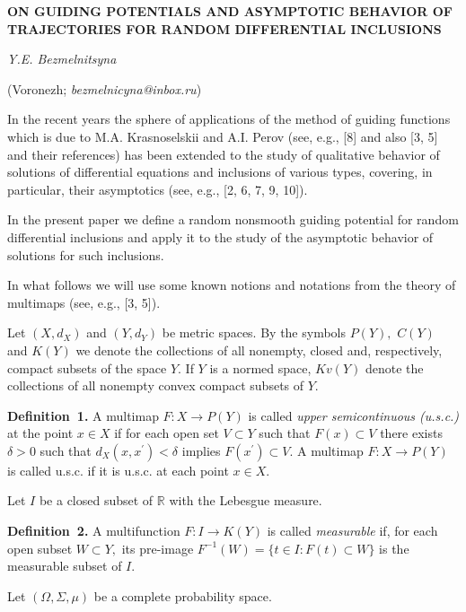 
\begin{center}
    {\bf ON GUIDING POTENTIALS AND ASYMPTOTIC BEHAVIOR OF TRAJECTORIES FOR RANDOM DIFFERENTIAL INCLUSIONS}

    {\it Y.E. Bezmelnitsyna }

    (Voronezh; {\it bezmelnicyna@inbox.ru})
\end{center}


In the recent years the sphere of applications of the method of guiding functions which is due to M.A. Krasnoselskii and A.I. Perov (see, e.g., [8] and also [3, 5] and their references) has been extended to the study of qualitative behavior of solutions of differential equations and inclusions of various types, covering, in particular, their asymptotics (see, e.g., [2, 6, 7, 9, 10]).

In the present paper we define a random nonsmooth guiding potential for random differential inclusions and apply it to the study of the asymptotic behavior of solutions for such inclusions.

In what follows we will use some known notions and notati\-ons from the theory of multimaps (see, e.g., [3, 5]).

Let $(X,d_X)$ and $(Y,d_Y)$ be metric spaces. By the symbols $P(Y),$ $C(Y)$ and $K(Y)$ we denote the collections of all nonempty, closed and, respectively, compact subsets of the space $Y.$ If $Y$ is a normed space, $Kv(Y)$ denote the collections of all nonempty convex compact subsets of $Y.$

\textbf{Definition~1.}
A multimap $F:X \to P(Y)$ is called {\it upper semicontinuous (u.s.c.)} at the point $x\in X$ if for each open set $V \subset Y$ such that $F(x) \subset V$ there exists $\delta >0$ such that $d_X(x,x^\prime)<\delta$ implies $F(x^\prime)\subset V.$ A multimap $F:X \to P(Y)$ is called u.s.c. if it is u.s.c. at each point $x\in X.$

Let $I$ be a closed subset of $\mathbb{R}$ with the Lebesgue measure.

\textbf{Definition~2.}
A multifunction $F:I \to K(Y)$ is called {\it measurable} if, for each open subset $W \subset Y,$ its pre-image \linebreak
$F^{-1}(W)=\{t\in I:F(t)\subset W\}$ is the measurable subset of $I$.

Let $(\Omega,\Sigma,\mu)$ be a complete probability space.

